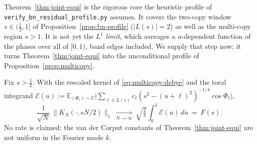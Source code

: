\noindent Theorem~\ref{thm:joint-equi} is the rigorous core the heuristic profile of
\texttt{verify\_bn\_residual\_profile.py} assumes. It covers the two-copy window $s\in(\tfrac12,1]$ of
Proposition~\ref{prop:bn-profile} ($|L(s)|=2$) as well as the multi-copy region $s>1$. It is not yet the $L^1$
\emph{limit}, which averages a $u$-dependent function of the phases over all of $[0,1)$, band edges
included. We supply that step now; it turns Theorem~\ref{thm:joint-equi} into the unconditional profile of
Proposition~\ref{prop:multicopy}.

\begin{theorem}\label{thm:uniform-transfer}
Fix $s>\tfrac12$. With the rescaled kernel of \eqref{eq:multicopy-debye} and the toral integrand
$\mathcal E(u):=\mathbb E_{(\Phi_\ell)\sim U}\bigl|\sum_{\ell\in L(s)}c_\ell(s^2-(u+\ell)^2)^{-1/4}\cos\Phi_\ell\bigr|$,
\[
  \frac1{\sqrt N}\,\bigl\|K_N(\cdot,sN/2)\bigr\|_1\ \xrightarrow[N\to\infty]{}\ \sqrt{\tfrac2\pi}\int_0^1\mathcal E(u)\,du\ =\ F(s).
\]
No rate is claimed: the van der Corput constants of Theorem~\ref{thm:joint-equi} are not uniform in the
Fourier mode $k$.
\end{theorem}

